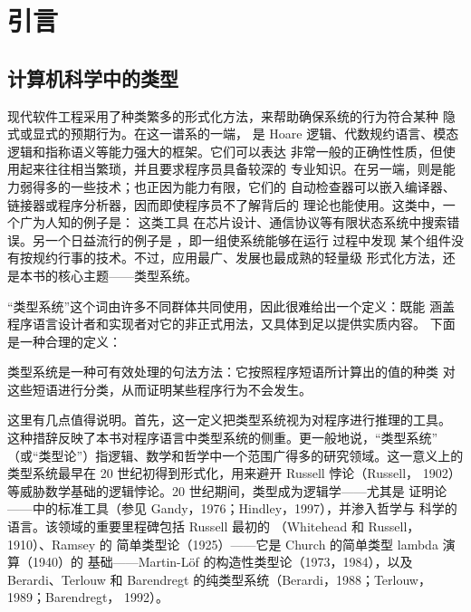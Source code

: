 
\chapter{引言}
\label{chap:1}

\section{计算机科学中的类型}

现代软件工程采用了种类繁多的形式化方法，来帮助确保系统的行为符合某种
隐式或显式的预期行为。在这一谱系的一端，
是 Hoare
逻辑、代数规约语言、模态逻辑和指称语义等能力强大的框架。它们可以表达
非常一般的正确性性质，但使用起来往往相当繁琐，并且要求程序员具备较深的
专业知识。在另一端，则是能力弱得多的一些技术；也正因为能力有限，它们的
自动检查器可以嵌入编译器、链接器或程序分析器，因而即使程序员不了解背后的
理论也能使用。这类中，一个广为人知的例子是：
这类工具
在芯片设计、通信协议等有限状态系统中搜索错误。另一个日益流行的例子是
，即一组使系统能够在运行
过程中发现
某个组件没有按规约行事的技术。不过，应用最广、发展也最成熟的轻量级
形式化方法，还是本书的核心主题——类型系统。

“类型系统”这个词由许多不同群体共同使用，因此很难给出一个定义：既能
涵盖程序语言设计者和实现者对它的非正式用法，又具体到足以提供实质内容。
下面是一种合理的定义：

\begin{keystatement}
  类型系统是一种可有效处理的句法方法：它按照程序短语所计算出的值的种类
  对这些短语进行分类，从而证明某些程序行为不会发生。
\end{keystatement}

这里有几点值得说明。首先，这一定义把类型系统视为对程序进行推理的工具。
这种措辞反映了本书对程序语言中类型系统的侧重。更一般地说，“类型系统”
（或“类型论”）指逻辑、数学和哲学中一个范围广得多的研究领域。这一意义上的
类型系统最早在 20 世纪初得到形式化，用来避开 Russell 悖论（Russell，
1902）等威胁数学基础的逻辑悖论。20 世纪期间，类型成为逻辑学——尤其是
证明论——中的标准工具（参见 Gandy，1976；Hindley，1997），并渗入哲学与
科学的语言。该领域的重要里程碑包括 Russell 最初的
（Whitehead 和 Russell，1910）、Ramsey 的
简单类型论（1925）——它是 Church 的简单类型 lambda 演算（1940）的
基础——Martin-Löf 的构造性类型论（1973，1984），以及 Berardi、Terlouw
和 Barendregt 的纯类型系统（Berardi，1988；Terlouw，1989；Barendregt，
1992）。

